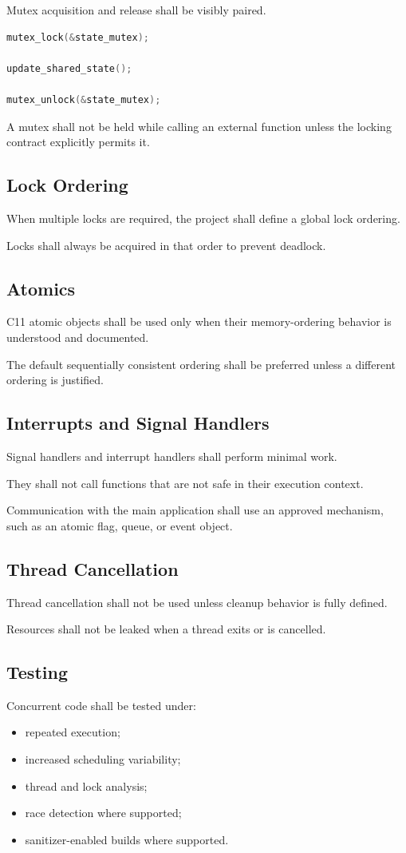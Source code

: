 Mutex acquisition and release shall be visibly paired.

\begin{lstlisting}[language=C]
mutex_lock(&state_mutex);

update_shared_state();

mutex_unlock(&state_mutex);
\end{lstlisting}

A mutex shall not be held while calling an external function unless the locking contract explicitly permits it.

\subsection{Lock Ordering}

When multiple locks are required, the project shall define a global lock ordering.

Locks shall always be acquired in that order to prevent deadlock.

\subsection{Atomics}

C11 atomic objects shall be used only when their memory-ordering behavior is understood and documented.

The default sequentially consistent ordering shall be preferred unless a different ordering is justified.

\subsection{Interrupts and Signal Handlers}

Signal handlers and interrupt handlers shall perform minimal work.

They shall not call functions that are not safe in their execution context.

Communication with the main application shall use an approved mechanism, such as an atomic flag, queue, or event object.

\subsection{Thread Cancellation}

Thread cancellation shall not be used unless cleanup behavior is fully defined.

Resources shall not be leaked when a thread exits or is cancelled.

\subsection{Testing}

Concurrent code shall be tested under:

\begin{itemize}
	\item repeated execution;
	\item increased scheduling variability;
	\item thread and lock analysis;
	\item race detection where supported;
	\item sanitizer-enabled builds where supported.
\end{itemize}
